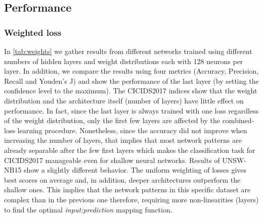 \documentclass[conference]{IEEEtran}
\newcommand{\mynote}[3]{
    \fbox{\bfseries\sffamily\scriptsize#1}
    {\small$\blacktriangleright$\textsf{\emph{\color{#3}{#2}}}$\blacktriangleleft$}}
\newcommand{\todo}[1]{\mynote{TODO}{#1}{red}}
\begin{document}
\subsection{Performance}

\subsubsection{Weighted loss}
In \autoref{tab:weights} we gather results from different networks trained using different numbers of hidden layers and weight distributions each with 128 neurons per layer. In addition, we compare the results using four metrics (Accuracy, Precision, Recall and Youden's J) and show the performance of the last layer (by setting the confidence level to the maximum). The CICIDS2017 indices %
show that the weight distribution and the architecture itself (number of layers) have little effect on performance. In fact, since the last layer is always trained with one loss regardless of the weight distribution, only the first few layers are affected by the combined-loss learning procedure. Nonetheless, since the accuracy did not improve when increasing the number of layers, that implies that most network patterns are already separable after the few first layers which makes the classification task for CICIDS2017 manageable even for shallow neural networks. Results of UNSW-NB15 show a slightly different behavior. %
The uniform weighting of losses gives best scores on average and, in addition, deeper architectures outperform the shallow ones. This implies that the network patterns in this specific dataset are complex than in the previous one therefore, requiring more non-linearities (layers) to find the optimal \emph{input:prediction} mapping function.
\end{document}
